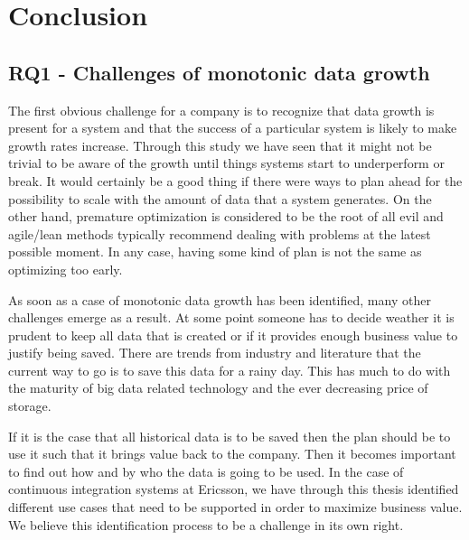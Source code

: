 \chapter{Conclusion}
\label{chap:conclusion}


\section{RQ1 - Challenges of monotonic data growth}
The first obvious challenge for a company is to recognize that data growth is present for a system and that the success of a particular system is likely to make growth rates increase. Through this study we have seen that it might not be trivial to be aware of the growth until things systems start to underperform or break. It would certainly be a good thing if there were ways to plan ahead for the possibility to scale with the amount of data that a system generates. On the other hand, premature optimization is considered to be the root of all evil and agile/lean methods typically recommend dealing with problems at the latest possible moment. In any case, having some kind of plan is not the same as optimizing too early.

As soon as a case of monotonic data growth has been identified, many other challenges emerge as a result. At some point someone has to decide weather it is prudent to keep all data that is created or if it provides enough business value to justify being saved. There are trends from industry and literature that the current way to go is to save this data for a rainy day. This has much to do with the maturity of big data related technology and the ever decreasing price of storage.

If it is the case that all historical data is to be saved then the plan should be to use it such that it brings value back to the company. Then it becomes important to find out how and by who the data is going to be used. In the case of continuous integration systems at Ericsson, we have through this thesis identified different use cases that need to be supported in order to maximize business value. We believe this identification process to be a challenge in its own right.



